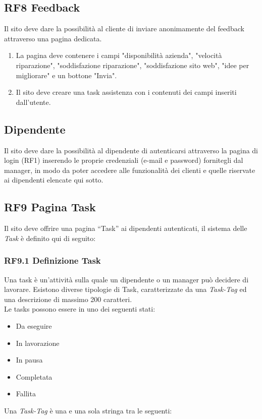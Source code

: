 \documentclass{report}
\begin{document}
\subsection*{RF8 Feedback}
Il sito deve dare la possibilità al cliente di inviare anonimamente del feedback attraverso una pagina dedicata.
\begin{enumerate}
	\item La pagina deve contenere i campi "disponibilità azienda", "velocità riparazione", "soddisfazione riparazione", "soddisfazione sito web", "idee per migliorare" e un bottone "Invia".

	\item Il sito deve creare una task assistenza con i contenuti dei campi inseriti dall'utente.

	
\end{enumerate}

\subsection{Dipendente}
Il sito deve dare la possibilità al dipendente di autenticarsi attraverso la pagina di login (RF1) inserendo le proprie credenziali (e-mail e password) fornitegli dal manager, in modo da poter accedere alle funzionalità dei clienti  e quelle riservate ai dipendenti elencate qui sotto.

\subsection*{RF9 Pagina Task}

Il sito deve offrire una pagina “Task” ai dipendenti autenticati, il sistema delle \textit{Task} è definito qui di seguito:

\subsubsection*{RF9.1 Definizione Task}

Una task è un'attività sulla quale un dipendente o un manager può decidere di lavorare. Esistono diverse tipologie di Task, caratterizzate da una \textit{Task-Tag} ed una descrizione di massimo 200 caratteri.\\
Le tasks possono essere in uno dei seguenti stati: 
\begin{itemize}
	\item Da eseguire
	\item In lavorazione
	\item In pausa
	\item Completata
	\item Fallita
\end{itemize}
Una \textit{Task-Tag} è una e una sola stringa tra le seguenti:
\end{document}
